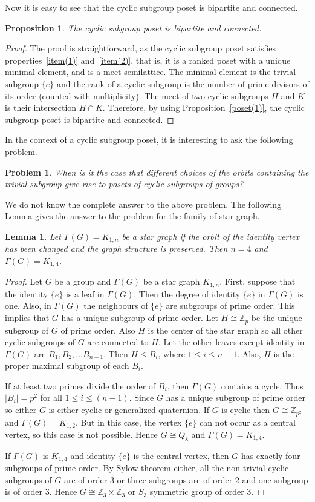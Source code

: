 \documentclass[11pt,twoside]{amsart}
\def \Z {{\mathbb{Z}}}
\newtheorem{lemma}[theorem]{Lemma}
\newtheorem{pro}[theorem]{Proposition}
\newtheorem{problem}[theorem]{Problem}
\begin{document}
Now it is easy to see that the cyclic subgroup poset is bipartite and connected.
\begin{pro}
    The cyclic subgroup poset is bipartite and connected.
\end{pro}
\begin{proof}
    The proof is straightforward, as the cyclic subgroup poset satisfies properties~\ref{item(1)} and~\ref{item(2)}, that is, it is a ranked poset with a unique minimal element, and is a meet semilattice. The minimal element is the trivial subgroup $\{e\}$ and
the rank of a cyclic subgroup is the number of prime divisors of its order
(counted with multiplicity). The meet of two cyclic subgroups $H$ and $K$ is their intersection $H\cap K$. Therefore, by using Proposition~\ref{poset(1)}, the cyclic subgroup poset is bipartite and connected.
\end{proof}
In the context of a cyclic subgroup poset, it is interesting to ask the following problem.
\begin{problem}
    When is it the case that different choices of the orbits containing the trivial subgroup give rise to posets of cyclic subgroups of groups?
\end{problem}
We do not know the complete answer to the above problem. The following Lemma gives the answer to the problem for the family of star graph.
\begin{lemma}
    Let $\Gamma (G)=K_{1,n}$ be a star graph if the orbit of the identity vertex has been changed and the graph structure is preserved. Then $n=4$ and $\Gamma (G)=K_{1,4}$.
\end{lemma}
\begin{proof}
   Let $G$ be a group and $\Gamma (G)$ be a star graph $K_{1,n}$. First, suppose that the identity $\{e\}$ is a leaf in $\Gamma (G)$. Then the degree of identity $\{e\}$ in $\Gamma (G)$ is one. Also, in $\Gamma (G)$ the neighbours of $\{e\}$ are subgroups of prime order. This implies that $G$ has a unique subgroup of prime order. Let $H\cong \Z_p$ be the unique subgroup of $G$ of prime order. Also $H$ is the center of the star graph so all other cyclic subgroups of $G$ are connected to $H$. Let the other leaves except identity in $\Gamma (G)$ are $B_1, B_2,\dots B_{n-1}$. Then $H\leq B_i$, where $1\leq i\leq n-1$. Also, $H$ is the proper maximal subgroup of each $B_i$.

   If at least two primes divide the order of $B_i$, then $\Gamma (G)$ contains a cycle. Thus $|B_i|=p^2$ for all $1\leq i\leq (n-1)$. Since $G$ has a unique subgroup of prime order so either $G$ is either cyclic or generalized quaternion. If $G$ is cyclic then $G\cong \Z_{p^2}$ and $\Gamma (G)=K_{1,2}$. But in this case, the vertex $\{e\}$ can not occur as a central vertex, so this case is not possible. Hence $G\cong Q_8$ and $\Gamma (G)=K_{1,4}$.
   
   If $\Gamma (G)$ is $K_{1,4}$ and identity $\{e\}$ is the central vertex, then $G$ has exactly four subgroups of prime order. By Sylow theorem either, all the non-trivial cyclic subgroups of $G$ are of order $3$ or three subgroups are of order $2$ and one subgroup is of order $3$. Hence $G\cong \Z_3\times \Z_3$ or $S_3$ symmetric group of order $3$.  
\end{proof} 
\end{document}
